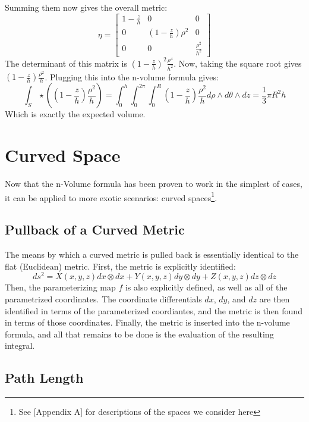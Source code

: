 \documentclass{article}
\begin{document}
Summing them now gives the overall metric:
\[
\eta = \begin{bmatrix}
 1-\frac{z}{h} & 0 & 0 \\
 0 & (1-\frac{z}{h}) \rho^2 & 0 \\
 0 & 0 & \frac{\rho^2}{h^2}
\end{bmatrix}
\]
The determinant of this matrix is $(1-\frac{z}{h})^2 \frac{\rho^4}{h^2}$. Now, taking the square root gives $(1-\frac{z}{h})\frac{\rho^2}{h}$. Plugging this into the n-volume formula gives:
\[
\int_S \star ((1-\frac{z}{h})\frac{\rho^2}{h})=\int_0^h \int_0^{2\pi} \int_0^R (1-\frac{z}{h})\frac{\rho^2}{h} d\rho \wedge d\theta \wedge dz = \frac{1}{3}\pi R^2h
\]
Which is exactly the expected volume.

\newpage

\section{Curved Space}
Now that the n-Volume formula has been proven to work in the simplest of cases, it can be applied to more exotic scenarios: curved spaces\footnote{See [Appendix A] for descriptions of the spaces we consider here}.

\subsection{Pullback of a Curved Metric}
The means by which a curved metric is pulled back is essentially identical to the flat (Euclidean) metric. First, the metric is explicitly identified:
\[
ds^2 = X(x,y,z) dx \otimes dx + Y(x,y,z) dy \otimes dy + Z(x,y,z) dz \otimes dz
\]
Then, the parameterizing map $f$ is also explicitly defined, as well as all of the parametrized coordinates. The coordinate differentials $dx$, $dy$, and $dz$ are then identified in terms of the parameterized coordiantes, and the metric is then found in terms of those coordinates. Finally, the metric is inserted into the n-volume formula, and all that remains to be done is the evaluation of the resulting integral.

\newpage
\subsection{Path Length}
\end{document}
